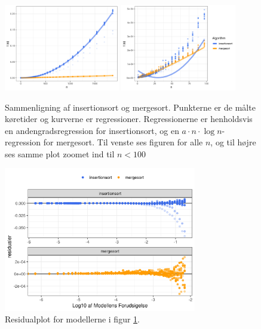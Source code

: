 \begin{figure} \centering
	\includegraphics[width=0.45\textwidth]{../img/toAlgoritmer.png}
	\includegraphics[width=0.45\textwidth]{../img/toAlgoritmerZoomed}
	\caption{Sammenligning af insertionsort og mergesort. Punkterne er de målte køretider og kurverne er regressioner. Regressionerne er henholdsvis en andengradsregression for insertionsort, og en $a \cdot n \cdot \log n$-regression for mergesort. Til venste ses figuren for alle $n$, og til højre ses samme plot zoomet ind til $n < 100$ }
	\label{fig:plot - to algoritmer}
\end{figure}

\begin{figure}
	\begin{center}
		\includegraphics[width=0.75\textwidth]{../img/toAlgoritmerResidual.png}
	\end{center}
	\caption{Residualplot for modellerne i figur \ref{fig:plot - to algoritmer}.}
	\label{fig:toAlgoritmerResidual}
\end{figure}



